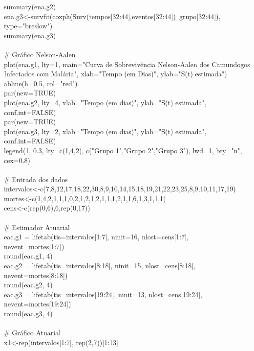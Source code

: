 \documentclass[12pt,a4paper]{article}
\begin{document}
	summary(ena.g2)\\
	ena.g3<-survfit(coxph(Surv(tempos[32:44],eventos[32:44])~grupo[32:44]), type="breslow")\\
	summary(ena.g3)\\
	\vspace{0.25cm}\\
	\# Gráfico Nelson-Aalen\\
	plot(ena.g1, lty=1, main="Curva de Sobrevivência Nelson-Aalen dos Camundogos Infectados com Malária", xlab="Tempo (em Dias)", ylab="S(t) estimada")\\
	abline(h=0.5, col="red")\\
	par(new=TRUE)\\
	plot(ena.g2, lty=4, xlab="Tempo (em dias)", ylab="S(t) estimada", conf.int=FALSE)\\
	par(new=TRUE)\\
	plot(ena.g3, lty=2, xlab="Tempo (em dias)", ylab="S(t) estimada", conf.int=FALSE)\\
	legend(1, 0.3, lty=c(1,4,2), c("Grupo 1","Grupo 2","Grupo 3"), lwd=1, bty="n", cex=0.8)\\
	\vspace{0.25cm}\\
	\# Entrada dos dados\\
	intervalos<-c(7,8,12,17,18,22,30,8,9,10,14,15,18,19,21,22,23,25,8,9,10,11,17,19)\\
	mortes<-c(1,4,2,1,1,1,0,2,1,2,1,2,1,1,1,2,1,1,6,1,3,1,1,1)\\
	cens<-c(rep(0,6),6,rep(0,17))\\
	\vspace{0.25cm}\\
	\# Estimador Atuarial\\
	eac.g1 = lifetab(tis=intervalos[1:7], ninit=16, nlost=cens[1:7], nevent=mortes[1:7])\\
	round(eac.g1, 4)\\
	eac.g2 = lifetab(tis=intervalos[8:18], ninit=15, nlost=cens[8:18], nevent=mortes[8:18])\\
	round(eac.g2, 4)\\
	eac.g3 = lifetab(tis=intervalos[19:24], ninit=13, nlost=cens[19:24], nevent=mortes[19:24])\\
	round(eac.g3, 4)\\
	\vspace{0.25cm}\\
	\# Gráfico Atuarial\\
	x1<-rep(intervalos[1:7], rep(2,7))[1:13]\\
\end{document}
